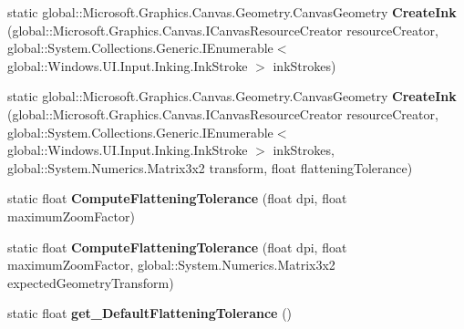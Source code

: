 \begin{DoxyCompactItemize}
\item 
\mbox{\label{class_microsoft_1_1_graphics_1_1_canvas_1_1_geometry_1_1_canvas_geometry_a42466cc94da19392c5dd77f1fd235a67}} 
static global\+::\+Microsoft.\+Graphics.\+Canvas.\+Geometry.\+Canvas\+Geometry {\bfseries Create\+Ink} (global\+::\+Microsoft.\+Graphics.\+Canvas.\+I\+Canvas\+Resource\+Creator resource\+Creator, global\+::\+System.\+Collections.\+Generic.\+I\+Enumerable$<$ global\+::\+Windows.\+U\+I.\+Input.\+Inking.\+Ink\+Stroke $>$ ink\+Strokes)
\item 
\mbox{\label{class_microsoft_1_1_graphics_1_1_canvas_1_1_geometry_1_1_canvas_geometry_a2ab66ac5c29e306f56d21b3368d42415}} 
static global\+::\+Microsoft.\+Graphics.\+Canvas.\+Geometry.\+Canvas\+Geometry {\bfseries Create\+Ink} (global\+::\+Microsoft.\+Graphics.\+Canvas.\+I\+Canvas\+Resource\+Creator resource\+Creator, global\+::\+System.\+Collections.\+Generic.\+I\+Enumerable$<$ global\+::\+Windows.\+U\+I.\+Input.\+Inking.\+Ink\+Stroke $>$ ink\+Strokes, global\+::\+System.\+Numerics.\+Matrix3x2 transform, float flattening\+Tolerance)
\item 
\mbox{\label{class_microsoft_1_1_graphics_1_1_canvas_1_1_geometry_1_1_canvas_geometry_af0a58e1e6450e34081143a65770bb043}} 
static float {\bfseries Compute\+Flattening\+Tolerance} (float dpi, float maximum\+Zoom\+Factor)
\item 
\mbox{\label{class_microsoft_1_1_graphics_1_1_canvas_1_1_geometry_1_1_canvas_geometry_a4cab7234385475a4109d2dcdca24ca39}} 
static float {\bfseries Compute\+Flattening\+Tolerance} (float dpi, float maximum\+Zoom\+Factor, global\+::\+System.\+Numerics.\+Matrix3x2 expected\+Geometry\+Transform)
\item 
\mbox{\label{class_microsoft_1_1_graphics_1_1_canvas_1_1_geometry_1_1_canvas_geometry_aec4a5123b972fd4576fdd3ab85f59718}} 
static float {\bfseries get\+\_\+\+Default\+Flattening\+Tolerance} ()
\item 
\mbox{\label{class_microsoft_1_1_graphics_1_1_canvas_1_1_geometry_1_1_canvas_geometry_a660756502ddaec1e43624023d23a5c60}} 

\end{DoxyCompactItemize}
